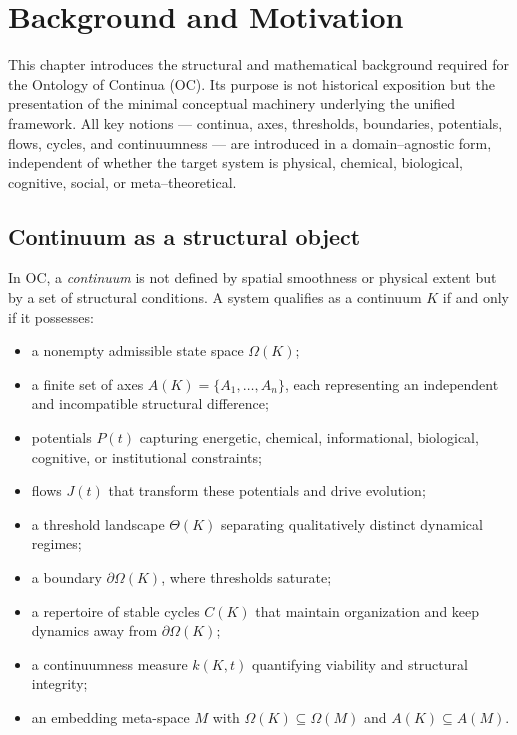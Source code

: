 
\section{Background and Motivation}
\label{sec:background}

This chapter introduces the structural and mathematical background required for the Ontology of Continua (OC).  
Its purpose is not historical exposition but the presentation of the minimal conceptual machinery underlying the unified framework.  
All key notions — continua, axes, thresholds, boundaries, potentials, flows, cycles, and continuumness — are introduced in a domain–agnostic form, independent of whether the target system is physical, chemical, biological, cognitive, social, or meta–theoretical.

\subsection{Continuum as a structural object}

In OC, a \emph{continuum} is not defined by spatial smoothness or physical extent but by a set of structural conditions.  
A system qualifies as a continuum \(K\) if and only if it possesses:

\begin{itemize}
    \item a nonempty admissible state space \(\Omega(K)\);
    \item a finite set of axes \(A(K)=\{A_1,\dots,A_n\}\), each representing an independent and incompatible structural difference;
    \item potentials \(P(t)\) capturing energetic, chemical, informational, biological, cognitive, or institutional constraints;
    \item flows \(J(t)\) that transform these potentials and drive evolution;
    \item a threshold landscape \(\Theta(K)\) separating qualitatively distinct dynamical regimes;
    \item a boundary \(\partial\Omega(K)\), where thresholds saturate;
    \item a repertoire of stable cycles \(C(K)\) that maintain organization and keep dynamics away from \(\partial\Omega(K)\);
    \item a continuumness measure \(k(K,t)\) quantifying viability and structural integrity;
    \item an embedding meta-space \(M\) with \(\Omega(K)\subseteq\Omega(M)\) and \(A(K)\subseteq A(M)\).
\end{itemize}

